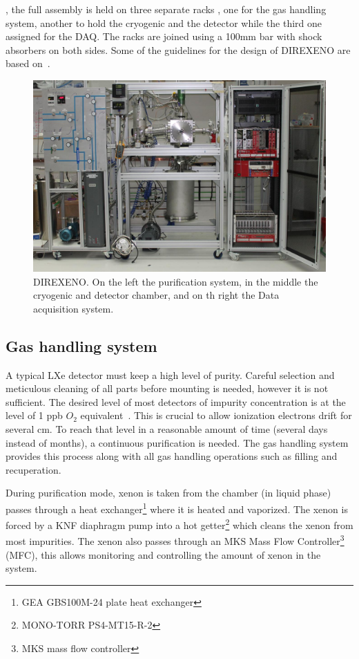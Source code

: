 , the full assembly is held on three separate racks , 
one for the gas handling system, another to hold the cryogenic and the detector while the third one  assigned for the DAQ. The racks are joined using a 100mm bar with shock absorbers on both sides. Some of the guidelines for the design of DIREXENO are based on~\cite{Giboni}.  

\begin{figure}[h]
\centerline{\includegraphics[width=0.8\linewidth]{FullDet.jpg}}
\caption{DIREXENO. On the left the purification system, in the middle the cryogenic and detector 
chamber, and on th right the Data acquisition system.}
\label{fig:fulldet}
\end{figure}

\subsection{Gas handling system}
\label{subsec:gas}

A typical LXe detector must keep a high level of purity. Careful selection and 
meticulous cleaning of all parts before mounting is needed, however it is not sufficient. The desired level of most detectors of impurity concentration is at the level of 1 ppb $O_2$ equivalent~\cite{Aprile:2009dv}. This is crucial to allow ionization electrons drift for several cm. To reach that level in a reasonable amount of time (several days instead of months), 
a continuous purification is needed. The gas handling system provides this process along with all gas handling operations such as filling and recuperation.

During purification mode, xenon is taken from the chamber (in liquid phase)
passes through a heat exchanger\footnote{GEA GBS100M-24 plate heat exchanger} 
where it is heated and vaporized. The xenon is forced 
by a KNF diaphragm pump into a hot getter\footnote{MONO-TORR
PS4-MT15-R-2} which cleans the xenon from most impurities. The xenon
also passes through an MKS Mass Flow Controller\footnote{MKS mass flow controller} (MFC), 
this allows monitoring and controlling the amount of xenon in the system. 

